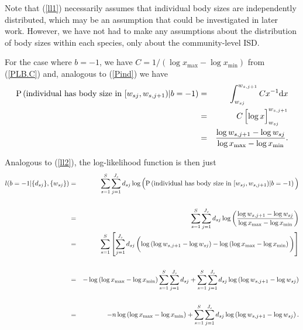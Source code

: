 \documentclass[12pt, letter]{article}
\newcommand{\eb}{\begin{eqnarray}}
\newcommand{\ee}{\end{eqnarray}}
\newcommand{\xmin}{x_{\mathrm{min}}}
\newcommand{\xmax}{x_{\mathrm{max}}}
\begin{document}
Note that (\ref{ll1}) necessarily assumes that individual body sizes are
independently distributed, which may be an assumption that could be investigated
in later work. However, we have not had to make any assumptions about the
distribution of body sizes within each species, only about the community-level
ISD.

For the case where $b = -1$, we have $C = 1 / (\log \xmax - \log \xmin)$ from
(\ref{PLB.C}) and, analogous to (\ref{Pind}) we have
\eb
\mbox{P}\left(\mbox{individual has body size in }[w_{sj}, w_{s, j+1}) | b =
  -1\right) & = & \int_{w_{sj}}^{w_{s, j+1}} C x^{-1} \mbox{d}x\\ & = & C \left[
  \log x {\vrule height 12pt width 0pt} \right]_{w_{sj}}^{w_{s, j+1}}\\
  & = & \frac{\log w_{s, j+1} - \log w_{sj}}{\log \xmax - \log \xmin}.
\label{Pindbmin1}
\ee

Analogous to (\ref{ll2}), the log-likelihood function is then just
\eb
\nonumber l(b =-1| \{d_{sj} \}, \{w_{sj} \}) & = & \sum_{s=1}^{S} \sum_{j=1}^{J_s}
d_{sj} \log \left( \mbox{P}\left(\mbox{individual has body size in }[w_{sj},
    w_{s, j+1}) | b = -1\right) {\vrule height 12pt width 0pt} \right)\\
& & \\
& = & \sum_{s=1}^{S} \sum_{j=1}^{J_s} d_{sj} \log \left( \frac{\log w_{s, j+1}
    - \log w_{sj}}{\log \xmax - \log \xmin}\right)\\
\nonumber & = &
  \sum_{s=1}^{S} \left[ \sum_{j=1}^{J_s} d_{sj} \left( \log \left( \log w_{s,
      j+1} - \log w_{sj}\right) - \log \left( \log \xmax - \log \xmin \right)
  {\vrule height 14pt width 0pt} \right) \right]\\
& & \\
\nonumber & = & -
  \log \left( \log \xmax - \log \xmin \right) \sum_{s=1}^{S} \sum_{j=1}^{J_s}
  d_{sj} + \sum_{s=1}^{S} \sum_{j=1}^{J_s} d_{sj} \log \left( \log w_{s, j+1}
    - \log w_{sj}\right)\\
  & & \\
\nonumber & = & - n \log \left( \log \xmax -
  \log \xmin \right) + \sum_{s=1}^{S} \sum_{j=1}^{J_s} d_{sj} \log \left( \log
  w_{s, j+1} - \log w_{sj}\right).
\label{llbinbmin1}\\
\ee
\end{document}
